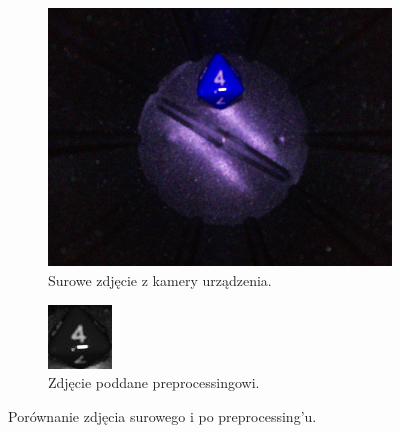 \begin{figure}[H]
    \centering
    \begin{subfigure}[t]{0.45\linewidth}
        \centering
        \includegraphics[width=\linewidth]{chapters/04-czytanie/figures/4raw}
        \caption{Surowe zdjęcie z kamery urządzenia.}
        \label{fig:4raw}
    \end{subfigure}
    \hfill
    \begin{subfigure}[t]{0.45\linewidth}
        \centering
        \includegraphics[width=\linewidth]{chapters/04-czytanie/figures/4processed}
        \caption{Zdjęcie poddane preprocessingowi.}
        \label{fig:4proc}
    \end{subfigure}
    \caption{Porównanie zdjęcia surowego i po preprocessing’u.}
    \label{fig:4combined}
\end{figure}
\fi


